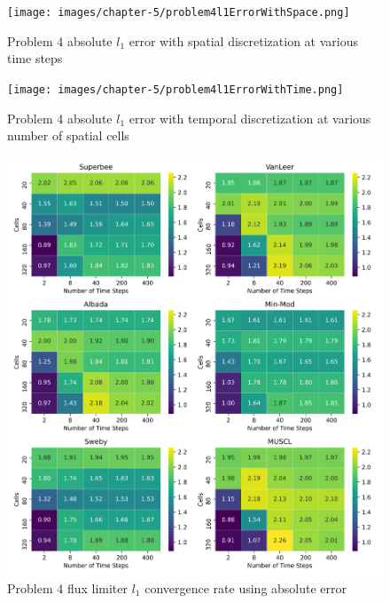 \clearpage

\begin{figure}[p]
    \centering
    \texttt{[image: images/chapter-5/problem4l1ErrorWithSpace.png]}
    \caption{Problem 4 absolute $l_{1}$ error with spatial discretization at various time steps }
    \label{fig:problem4_l1error_spatial_results}
\end{figure}

\clearpage

\begin{figure}[p]
    \centering
    \texttt{[image: images/chapter-5/problem4l1ErrorWithTime.png]}
    \caption{Problem 4 absolute $l_{1}$ error with temporal discretization at various number of spatial cells}
    \label{fig:problem4_l1error_time_results}
\end{figure}

\clearpage

\begin{figure}[p]
    \centering
    \includegraphics[width=6in]{images/chapter-5/problem4l1FluxLimiterConvergenceRate.png}
    \caption{Problem 4 flux limiter $l_{1}$ convergence rate using absolute error}
    \label{fig:problem4_l1error_fluxlimiter_convergence_rate}
\end{figure}

